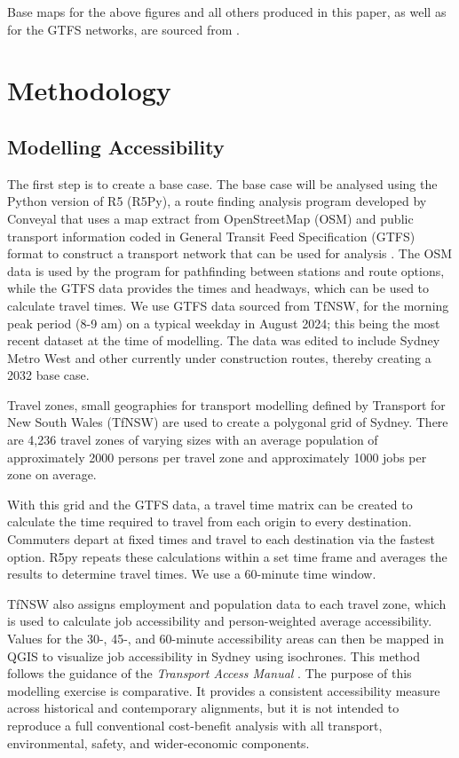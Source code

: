 \documentclass[preprint,12pt,authoryear]{elsarticle}
\begin{document}
Base maps for the above figures and all others produced in this paper, as well as for the GTFS networks, are sourced from  \textcite{OpenStreetMap}. 

\section{Methodology}
\label{sec:methodology}
\subsection{Modelling Accessibility} \label{method accessibility}

The first step is to create a base case. The base case will be analysed using the Python version of R5 (R5Py), a route finding analysis program developed by Conveyal that uses a map extract from OpenStreetMap (OSM) and public transport information coded in General Transit Feed Specification (GTFS) format to construct a transport network that can be used for analysis \parencite{fink_2022_7060438}. The OSM data is used by the program for pathfinding between stations and route options, while the GTFS data provides the times and headways, which can be used to calculate travel times. We use GTFS data sourced from TfNSW, for the morning peak period (8-9 am) on a typical weekday in August 2024; this being the most recent dataset at the time of modelling. The data was edited to include Sydney Metro West and other currently under construction routes, thereby creating a 2032 base case.

Travel zones, small geographies for transport modelling defined by Transport for New South Wales (TfNSW) \parencite{TfNSW_Travel_Zones_2016} are used to create a polygonal grid of Sydney.  There are 4,236 travel zones of varying sizes with an average population of approximately 2000 persons per travel zone and approximately 1000 jobs per zone on average.

With this grid and the GTFS data, a travel time matrix can be created to calculate the time required to travel from each origin to every destination. Commuters depart at fixed times and travel to each destination via the fastest option. R5py repeats these calculations within a set time frame and averages the results to determine travel times. We use a 60-minute time window. 

TfNSW also assigns employment and population data to each travel zone, which is used to calculate job accessibility and person-weighted average accessibility. Values for the 30-, 45-, and 60-minute accessibility areas can then be mapped in QGIS to visualize job accessibility in Sydney using isochrones. This method follows the guidance of the \textit{Transport Access Manual} \parencite{levinson2020a}. {The purpose of this modelling exercise is comparative. It provides a consistent accessibility measure across historical and contemporary alignments, but it is not intended to reproduce a full conventional cost-benefit analysis with all transport, environmental, safety, and wider-economic components.}
\end{document}
